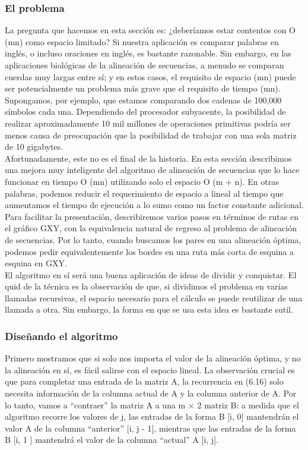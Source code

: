 \documentclass[a4paper, 12pt]{book}
\theoremstyle{dotless}
\begin{document}
\subsubsection*{El problema}

La pregunta que hacemos en esta sección es: ¿deberíamos estar contentos con O (mn) como espacio limitado? Si nuestra aplicación es comparar palabras en inglés, o incluso oraciones en inglés, es bastante razonable. Sin embargo, en las aplicaciones biológicas de la alineación de secuencias, a menudo se comparan cuerdas muy largas entre sí; y en estos casos, el requisito de espacio (mn) puede ser potencialmente un problema más grave que el requisito de tiempo (mn). Supongamos, por ejemplo, que estamos comparando dos cadenas de 100,000 símbolos cada una. Dependiendo del procesador subyacente, la posibilidad de realizar aproximadamente 10 mil millones de operaciones primitivas podría ser menos causa de preocupación que la posibilidad de trabajar con una sola matriz de 10 gigabytes.\\

Afortunadamente, este no es el final de la historia. En esta sección describimos una mejora muy inteligente del algoritmo de alineación de secuencias que lo hace funcionar en tiempo O (mn) utilizando solo el espacio O (m + n). En otras palabras, podemos reducir el requerimiento de espacio a lineal al tiempo que aumentamos el tiempo de ejecución a lo sumo como un factor constante adicional. Para facilitar la presentación, describiremos varios pasos en términos de rutas en el gráfico GXY, con la equivalencia natural de regreso al problema de alineación de secuencias. Por lo tanto, cuando buscamos los pares en una alineación óptima, podemos pedir equivalentemente los bordes en una ruta más corta de esquina a esquina en GXY.\\

El algoritmo en sí será una buena aplicación de ideas de dividir y conquistar. El quid de la técnica es la observación de que, si dividimos el problema en varias llamadas recursivas, el espacio necesario para el cálculo se puede reutilizar de una llamada a otra. Sin embargo, la forma en que se usa esta idea es bastante sutil.\\

\subsubsection*{Diseñando el algoritmo}

Primero mostramos que si solo nos importa el valor de la alineación óptima, y no la alineación en sí, es fácil salirse con el espacio lineal. La observación crucial es que para completar una entrada de la matriz A, la recurrencia en (6.16) solo necesita información de la columna actual de A y la columna anterior de A. Por lo tanto, vamos a ``contraer'' la matriz A a una m × 2 matriz B: a medida que el algoritmo recorre los valores de j, las entradas de la forma B [i, 0] mantendrán el valor A de la columna ``anterior'' [i, j - 1], mientras que las entradas de la forma B [i, 1 ] mantendrá el valor de la columna ``actual'' A [i, j].\\
\end{document}
